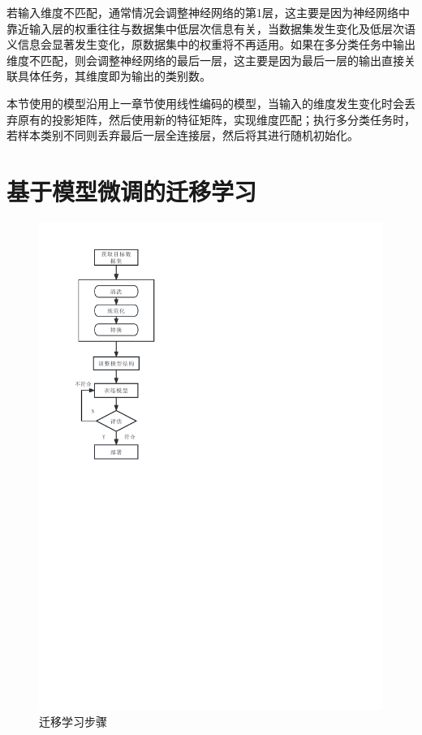 若输入维度不匹配，通常情况会调整神经网络的第1层，这主要是因为神经网络中靠近输入层的权重往往与数据集中低层次信息有关，当数据集发生变化及低层次语义信息会显著发生变化，原数据集中的权重将不再适用。如果在多分类任务中输出维度不匹配，则会调整神经网络的最后一层，这主要是因为最后一层的输出直接关联具体任务，其维度即为输出的类别数。

本节使用的模型沿用上一章节使用线性编码的模型，当输入的维度发生变化时会丢弃原有的投影矩阵，然后使用新的特征矩阵，实现维度匹配；执行多分类任务时，若样本类别不同则丢弃最后一层全连接层，然后将其进行随机初始化。
\section{基于模型微调的迁移学习}
\begin{figure}
    \centering
    \includegraphics[height=.5\textheight,keepaspectratio]{img/transfer/transfer_method.pdf}
    \caption{迁移学习步骤}
    \label{fig:transfer_method}
\end{figure}
